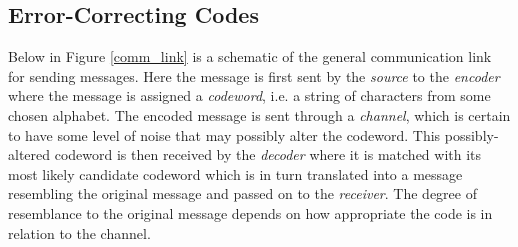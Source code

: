 \documentclass[conference]{IEEEtran}
\theoremstyle{definition}
\begin{document}
\subsection{Error-Correcting Codes}
Below in Figure \ref{comm_link} is a schematic of the general
communication link for sending messages.  Here the message is
first sent by the \emph{source} to the \emph{encoder} where
the message is assigned a \emph{codeword}, i.e. a string of
characters from some chosen alphabet.  The encoded message is
sent through a \emph{channel}, which is certain to have some
level of noise that may possibly alter the codeword.  This
possibly-altered codeword is then received by the \emph{decoder}
where it is matched with its most likely candidate codeword
which is in turn translated into a message resembling the
original message and passed on to the \emph{receiver}.
The degree of resemblance to the original message depends
on how appropriate the code is in relation to the channel.\\
\end{document}
